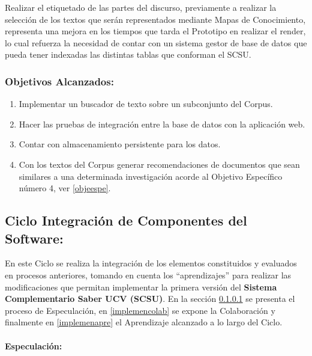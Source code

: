 \documentclass[
  12pt,
  openany]{book}
\begin{document}
Realizar el etiquetado de las partes del discurso, previamente a realizar la selección de los textos que serán representados mediante Mapas de Conocimiento, representa una mejora en los tiempos que tarda el Prototipo en realizar el render, lo cual refuerza la necesidad de contar con un sistema gestor de base de datos que pueda tener indexadas las distintas tablas que conforman el SCSU.

\hypertarget{objetivos-alcanzados-1}{%
\subsubsection{Objetivos Alcanzados:}\label{objetivos-alcanzados-1}}

\begin{enumerate}
\def\labelenumi{\arabic{enumi}.}
\item
  Implementar un buscador de texto sobre un subconjunto del Corpus.
\item
  Hacer las pruebas de integración entre la base de datos con la aplicación web.
\item
  Contar con almacenamiento persistente para los datos.
\item
  Con los textos del Corpus generar recomendaciones de documentos que sean similares a una determinada investigación acorde al Objetivo Específico número 4, ver \ref{objeespe}.
\end{enumerate}

\newpage

\hypertarget{desarrollociclos4}{%
\subsection{Ciclo Integración de Componentes del Software:}\label{desarrollociclos4}}

En este Ciclo se realiza la integración de los elementos constituidos y evaluados en procesos anteriores, tomando en cuenta los ``aprendizajes'' para realizar las modificaciones que permitan implementar la primera versión del \textbf{Sistema Complementario Saber UCV (SCSU)}. En la sección \ref{implemenesp} se presenta el proceso de Especulación, en \ref{implemencolab} se expone la Colaboración y finalmente en \ref{implemenapre} el Aprendizaje alcanzado a lo largo del Ciclo.

\hypertarget{implemenesp}{%
\paragraph{Especulación:}\label{implemenesp}}
\end{document}
